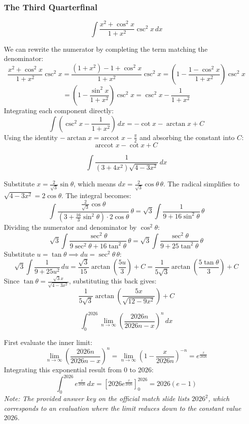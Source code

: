 \subsubsection*{The Third Quarterfinal}
\begin{questions}
\question 
\[ \int \frac{x^2 + \cos^2 x}{1 + x^2} \csc^2 x \, dx \]
\begin{solution}
We can rewrite the numerator by completing the term matching the denominator:
\[ \frac{x^2 + \cos^2 x}{1 + x^2} \csc^2 x = \frac{(1+x^2) - 1 + \cos^2 x}{1 + x^2} \csc^2 x = \left(1 - \frac{1 - \cos^2 x}{1 + x^2}\right) \csc^2 x \]
\[ = \left(1 - \frac{\sin^2 x}{1 + x^2}\right) \csc^2 x = \csc^2 x - \frac{1}{1 + x^2} \]
Integrating each component directly:
\[ \int \left(\csc^2 x - \frac{1}{1 + x^2}\right) \, dx = -\cot x - \arctan x + C \]
Using the identity $-\arctan x = \text{arccot } x - \frac{\pi}{2}$ and absorbing the constant into $C$:
\[ \text{arccot } x - \cot x + C \]
\end{solution}

\question 
\[ \int \frac{1}{(3 + 4x^2)\sqrt{4 - 3x^2}} \, dx \]
\begin{solution}
Substitute $x = \frac{2}{\sqrt{3}}\sin\theta$, which means $dx = \frac{2}{\sqrt{3}}\cos\theta \, \theta$. The radical simplifies to $\sqrt{4 - 3x^2} = 2\cos\theta$. The integral becomes:
\[ \int \frac{\frac{2}{\sqrt{3}}\cos\theta}{\left(3 + \frac{16}{3}\sin^2\theta\right) \cdot 2\cos\theta} \, \theta = \sqrt{3} \int \frac{1}{9 + 16\sin^2\theta} \, \theta \]
Dividing the numerator and denominator by $\cos^2\theta$:
\[ \sqrt{3} \int \frac{\sec^2\theta}{9\sec^2\theta + 16\tan^2\theta} \, \theta = \sqrt{3} \int \frac{\sec^2\theta}{9 + 25\tan^2\theta} \, \theta \]
Substitute $u = \tan\theta \implies du = \sec^2\theta \, \theta$:
\[ \sqrt{3} \int \frac{1}{9 + 25u^2} \, du = \frac{\sqrt{3}}{15}\arctan\left(\frac{5u}{3}\right) + C = \frac{1}{5\sqrt{3}}\arctan\left(\frac{5\tan\theta}{3}\right) + C \]
Since $\tan\theta = \frac{\sqrt{3}x}{\sqrt{4-3x^2}}$, substituting this back gives:
\[ \frac{1}{5\sqrt{3}}\arctan\left(\frac{5x}{\sqrt{12-9x^2}}\right) + C \]
\end{solution}

\question 
\[ \int_{0}^{2026} \lim_{n\to\infty} \left(\frac{2026n}{2026n - x}\right)^n \, dx \]
\begin{solution}
First evaluate the inner limit:
\[ \lim_{n\to\infty} \left(\frac{2026n}{2026n - x}\right)^n = \lim_{n\to\infty} \left(1 - \frac{x}{2026n}\right)^{-n} = e^{\frac{x}{2026}} \]
Integrating this exponential result from $0$ to $2026$:
\[ \int_{0}^{2026} e^{\frac{x}{2026}} \, dx = \left[ 2026e^{\frac{x}{2026}} \right]_{0}^{2026} = 2026(e - 1) \]
\textit{Note: The provided answer key on the official match slide lists $2026^2$, which corresponds to an evaluation where the limit reduces down to the constant value $2026$.}
\end{solution}
\end{questions}

